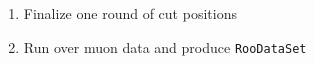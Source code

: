 

\begin{enumerate}
\item Finalize one round of cut positions
\item Run over muon data and produce \texttt{RooDataSet}
\end{enumerate}

